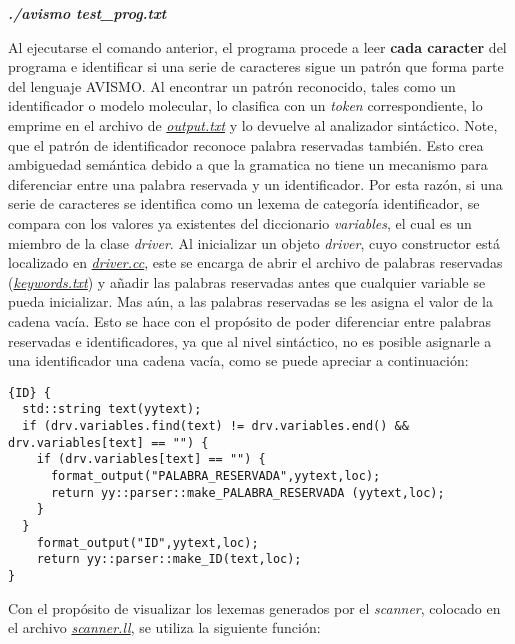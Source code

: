 \begin{center}
\textbf{\textit{./avismo test\_prog.txt}}
\end{center}

Al ejecutarse el comando anterior, el programa procede a leer \textbf{cada caracter} del programa e identificar si una serie de caracteres sigue un patrón que forma parte del lenguaje AVISMO. Al encontrar un patrón reconocido, tales como un identificador o modelo molecular, lo clasifica con un \textit{token} correspondiente, lo emprime en el archivo de \href{https://github.com/aramis-matos/comp4999_compilers_project/blob/master/code/output.txt}\textit{output.txt} y lo devuelve al analizador sintáctico. Note, que el patrón de identificador reconoce palabra reservadas también. Esto crea ambiguedad semántica debido a que la gramatica no tiene un mecanismo para diferenciar entre una palabra reservada y un identificador. Por esta razón, si una serie de caracteres se identifica como un lexema de categoría identificador, se compara con los valores ya existentes del diccionario \textit{variables}, el cual es un miembro de la clase \textit{driver}. Al inicializar un objeto \textit{driver}, cuyo constructor está localizado en \href{https://github.com/aramis-matos/comp4999_compilers_project/blob/master/code/driver.cc}{\textit{driver.cc}}, este se encarga de abrir el archivo de
palabras reservadas (\href{https://github.com/aramis-matos/comp4999_compilers_project/blob/master/code/keywords.txt}{\textit{keywords.txt}}) y añadir las palabras reservadas antes que cualquier variable se pueda inicializar. Mas aún, a las palabras reservadas se les asigna el valor de la cadena vacía. Esto se hace con el propósito de poder diferenciar entre palabras reservadas e identificadores, ya que al nivel sintáctico, no es posible asignarle a una identificador una cadena vacía, como se puede apreciar a continuación:
\begin{lstlisting}
{ID} {	
  std::string text(yytext);
  if (drv.variables.find(text) != drv.variables.end() && drv.variables[text] == "") {
    if (drv.variables[text] == "") {
      format_output("PALABRA_RESERVADA",yytext,loc);
      return yy::parser::make_PALABRA_RESERVADA (yytext,loc);
    }
  }
	format_output("ID",yytext,loc);
	return yy::parser::make_ID(text,loc);
}
\end{lstlisting}
Con el propósito de visualizar los lexemas generados por el \textit{scanner}, colocado en el archivo \href{https://github.com/aramis-matos/comp4999_compilers_project/blob/master/code/scanner.ll}{\textit{scanner.ll}}, se utiliza la siguiente función:
